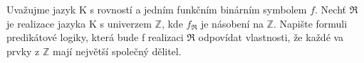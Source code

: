 Uvažujme jazyk K s rovností a jedním funkčním binárním symbolem $f$. Nechť $\Re$
je realizace jazyka K s univerzem $\mathbb{Z}$, kde $f_{\Re}$ je násobení na
$\mathbb{Z}$. Napište formuli predikátové logiky, která bude f realizaci $\Re$
odpovídat vlastnosti, že každé va prvky z $\mathbb{Z}$ mají největší společný
dělitel.
